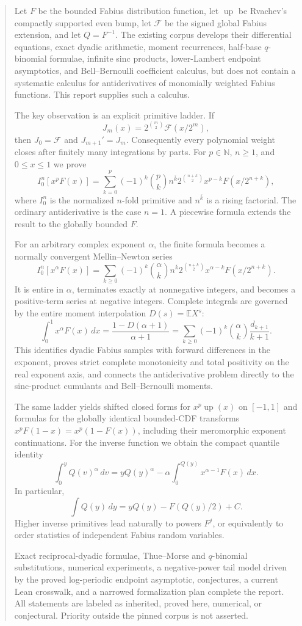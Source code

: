 \documentclass[11pt,oneside]{article}
\theoremstyle{definition}
\theoremstyle{remark}
\newcommand{\Up}{\operatorname{up}}
\newcommand{\E}{\mathbb E}
\newcommand{\N}{\mathbb N}
\newcommand{\rise}[2]{#1^{\overline{#2}}}
\newcommand{\1}{\mathbf 1}
\begin{document}
\begin{abstract}
Let $F$ be the bounded Fabius distribution function, let $\Up$ be Rvachev's compactly
supported even bump, let $\mathcal F$ be the signed global Fabius extension, and let
$Q=F^{-1}$.  The existing \repoPartl{} corpus develops their differential equations, exact
dyadic arithmetic, moment recurrences, half-base $q$-binomial formulae, infinite sinc
products, lower-Lambert endpoint asymptotics, and Bell--Bernoulli coefficient calculus, but
does not contain a systematic calculus for antiderivatives of monomially weighted Fabius
functions.  This report supplies such a calculus.

The key observation is an explicit primitive ladder.  If
\[
 J_m(x)=2^{\binom m2}\mathcal F(x/2^m),
\]
then $J_0=\mathcal F$ and $J_{m+1}'=J_m$.  Consequently every polynomial weight closes after
finitely many integrations by parts.  For $p\in\N$, $n\ge1$, and $0\le x\le1$ we prove
\[
 I_0^n[x^pF(x)]
 =\sum_{k=0}^{p}(-1)^k\binom pk\rise nk
 2^{\binom{n+k}{2}}x^{p-k}F(x/2^{n+k}),
\]
where $I_0^n$ is the normalized $n$-fold primitive and $\rise nk$ is a rising factorial.
The ordinary antiderivative is the case $n=1$.  A piecewise formula extends the result to
the globally bounded $F$.

For an arbitrary complex exponent $\alpha$, the finite formula becomes a normally
convergent Mellin--Newton series
\[
 I_0^n[x^\alpha F(x)]
 =\sum_{k\ge0}(-1)^k\binom\alpha k\rise nk
 2^{\binom{n+k}{2}}x^{\alpha-k}F(x/2^{n+k}).
\]
It is entire in $\alpha$, terminates exactly at nonnegative integers, and becomes a
positive-term series at negative integers.  Complete integrals are governed by the entire
moment interpolation $D(s)=\E X^s$:
\[
 \int_0^1x^\alpha F(x)\,dx
 =\frac{1-D(\alpha+1)}{\alpha+1}
 =\sum_{k\ge0}(-1)^k\binom\alpha k\frac{d_{k+1}}{k+1}.
\]
This identifies dyadic Fabius samples with forward differences in the exponent, proves
strict complete monotonicity and total positivity on the real exponent axis, and connects
the antiderivative problem directly to the sinc-product cumulants and Bell--Bernoulli
moments.

The same ladder yields shifted closed forms for $x^p\Up(x)$ on $[-1,1]$ and formulas for
the globally identical bounded-CDF transforms $x^pF(1-x)=x^p(1-F(x))$, including their
meromorphic exponent continuations.
For the inverse function we obtain the compact quantile identity
\[
 \int_0^y Q(v)^\alpha\,dv
 =yQ(y)^\alpha-\alpha\int_0^{Q(y)}x^{\alpha-1}F(x)\,dx.
\]
In particular,
\[
 \int Q(y)\,dy=yQ(y)-F\!\left(Q(y)/2\right)+C.
\]
Higher inverse primitives lead naturally to powers $F^j$, or equivalently to order
statistics of independent Fabius random variables.

Exact reciprocal-dyadic formulae, Thue--Morse and $q$-binomial substitutions, numerical
experiments, a negative-power tail model driven by the proved log-periodic endpoint
asymptotic, conjectures, a current Lean crosswalk, and a narrowed formalization plan complete
the report.  All statements are labeled as inherited, proved here, numerical, or
conjectural.  Priority outside the pinned corpus is not asserted.
\end{abstract}
\end{document}

